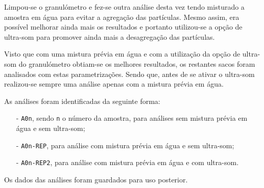 Limpou-se o granulómetro e fez-se outra análise desta vez tendo misturado a amostra em água para evitar a agregação das partículas.
Mesmo assim, era possível melhorar ainda mais os resultados e portanto utilizou-se a opção de ultra-som para promover ainda mais a desagregação das partículas.

Visto que com uma mistura prévia em água e com a utilização da opção de ultra-som do granulómetro obtiam-se os melhores resultados, os restantes sacos foram analisados com estas parametrizações.
Sendo que, antes de se ativar o ultra-som realizou-se sempre uma análise apenas com a mistura prévia em água.

As análises foram identificadas da seguinte forma:
\begin{itemize}
    \item[-] \texttt{A0n}, sendo \texttt{n} o número da amostra, para análises sem mistura prévia em água e sem ultra-som;
    \item[-] \texttt{A0n-REP}, para análise com mistura prévia em água e sem ultra-som;
    \item[-] \texttt{A0n-REP2}, para análise com mistura prévia em água e com ultra-som.
\end{itemize}


Os dados das análises foram guardados para uso posterior.

\hrulefill
\pagebreak



